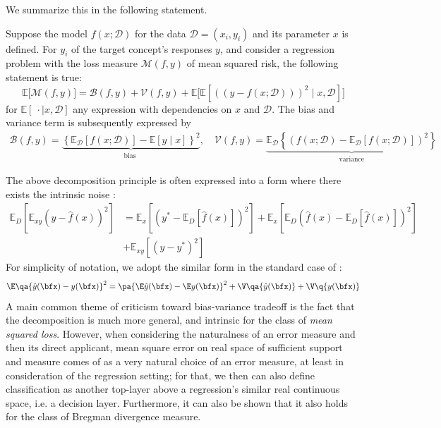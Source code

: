 We summarize this in the following statement. 

\begin{theorem}
    Suppose the model $f(x;\mathcal{D})$ for the data $\mathcal{D}=(x_i, y_i)$ and its parameter $x$ is defined. For $y_{i}$ of the target concept's responses $y$, and consider a regression problem with the loss measure $\mathcal{M}(f,y)$ of mean squared risk, the following statement is true: \begin{equation}
        \mathbb{E}\big[\mathcal{M}(f,y)\big] = \mathcal{B}(f,y) + \mathcal{V}(f,y) + \mathbb{E}\Big[\mathbb{E} \left[((y-f(x;\mathcal{D})))^{2}\mid x, \mathcal{D}\right]\Big]
    \end{equation}
    for $\mathbb{E}[\:\cdot\mid x, \mathcal{D}]$ any expression with dependencies on $x$ and $\mathcal{D}$. The bias and variance term is subsequently expressed by 
    \begin{align}
        \mathcal{B}(f,y) = \underbrace{\left\{ \mathbb{E}_{\mathcal{D}}[f(x;\mathcal{D})] - \mathbb{E}[y\mid x] \right\}^{2}}_{\text{bias }}, \quad \mathcal{V}(f,y) =\underbrace{\mathbb{E}_{\mathcal{D}} \left\{(f(x;\mathcal{D})- \mathbb{E}_{\mathcal{D}}[f(x;\mathcal{D})])^{2}\right\}}_{\text{variance}}
    \end{align}
\end{theorem}

The above decomposition principle is often expressed into a form where there exists the intrinsic noise \cite{brown2024biasvariance}: 
\begin{equation}
    \begin{split}
        \mathbb{E}_D \left[ \mathbb{E}_{xy} \left( y - \hat{f}(x) \right)^2 \right]
        &= 
         \mathbb{E}_x \left[ \left( y^* - \mathbb{E}_D[\hat{f}(x)] \right)^2 \right]
        + \mathbb{E}_x \left[ \mathbb{E}_D \left( \hat{f}(x) - \mathbb{E}_D[\hat{f}(x)] \right)^2 \right] \\
        &+ \mathbb{E}_{xy} \left[ \left( y - y^* \right)^2 \right]
    \end{split}
    \end{equation}
For simplicity of notation, we adopt the similar form in the standard case of \cite{adlam2020understandingdoubledescentrequires}: 
\begin{equation}
    \E \qa{\hat{y}(\bfx)-y(\bfx)}^2 = \pa{\E\hat{y}(\bfx) - \E y(\bfx)}^2 + \V\qa{\hat{y}(\bfx)} + \V\q{y(\bfx)}
\end{equation}
A main common theme of criticism toward bias-variance tradeoff is the fact that the decomposition is much more general, and intrinsic for the class of \textit{mean squared loss}. However, when considering the naturalness of an error measure and then its direct applicant, mean square error on real space of sufficient support and measure comes of as a very natural choice of an error measure, at least in consideration of the regression setting; for that, we then can also define classification as another top-layer above a regression's similar real continuous space, i.e. a decision layer. Furthermore, it can also be shown \cite{brown2024biasvariance,PfauBregmanDivergence} that it also holds for the class of Bregman divergence measure. 

